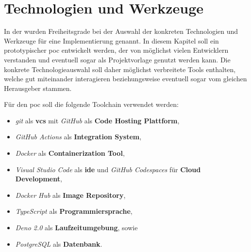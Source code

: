 \section{Technologien und Werkzeuge}
\label{sec:06-01_technologies-and-tools}

In der  wurden Freiheitsgrade bei der Auswahl der konkreten Technologien und Werkzeuge für eine Implementierung genannt. In diesem Kapitel soll ein prototypischer \Gls{poc} entwickelt werden, der von möglichst vielen Entwicklern verstanden und eventuell sogar als Projektvorlage genutzt werden kann. Die konkrete Technologieauswahl soll daher möglichst verbreitete Tools enthalten, welche gut miteinander interagieren beziehungsweise eventuell sogar vom gleichen Herausgeber stammen.

Für den \Gls{poc} soll die folgende Toolchain verwendet werden:

\begin{itemize}
    \item \textit{\Gls{git}} als \textbf{\Gls{vcs}} mit \textit{GitHub} als \textbf{Code Hosting Plattform},
    \item \textit{GitHub Actions} als \textbf{Integration System},
    \item \textit{Docker} als \textbf{Containerization Tool},
    \item \textit{Visual Studio Code} als \textbf{\Gls{ide}} und \textit{GitHub Codespaces} für \textbf{Cloud Development},
    \item \textit{Docker Hub} als \textbf{Image Repository},
    \item \textit{TypeScript} als \textbf{Programmiersprache},
    \item \textit{Deno 2.0} als \textbf{Laufzeitumgebung}, sowie
    \item \textit{PostgreSQL} als \textbf{Datenbank}.
\end{itemize}


